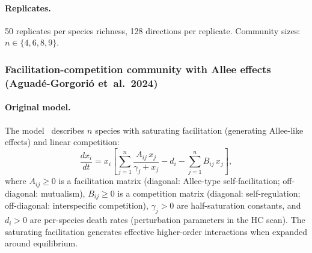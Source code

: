 \documentclass[pdflatex,sn-mathphys-num]{sn-jnl}%
\begin{document}
\paragraph{Replicates.} 50 replicates per species richness, 128 directions per replicate. Community sizes: $n \in \{4, 6, 8, 9\}$.


\subsubsection{Facilitation-competition community with Allee effects (Aguadé-Gorgorió et~al.\ 2024)}
\label{sec:si_aguade}

\paragraph{Original model.} The model~\cite{aguade-gorgorio_taxonomy_2024} describes $n$ species with saturating facilitation (generating Allee-like effects) and linear competition:
\begin{equation}\label{eq:aguade}
 \frac{dx_i}{dt}
 = x_i\!\left[
  \sum_{j=1}^n \frac{A_{ij}\,x_j}{\gamma_j + x_j}
 - d_i
 - \sum_{j=1}^n B_{ij}\,x_j
 \right],
\end{equation}
where $A_{ij} \ge 0$ is a facilitation matrix (diagonal: Allee-type self-facilitation; off-diagonal: mutualism), $B_{ij} \ge 0$ is a competition matrix (diagonal: self-regulation; off-diagonal: interspecific competition), $\gamma_j > 0$ are half-saturation constants, and $d_i > 0$ are per-species death rates (perturbation parameters in the HC scan). The saturating facilitation generates effective higher-order interactions when expanded around equilibrium.
\end{document}
